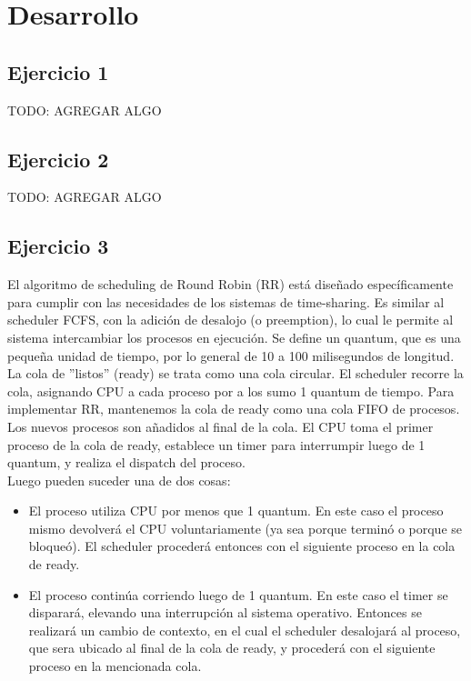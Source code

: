 \section{Desarrollo}

\subsection{Ejercicio 1}
TODO: AGREGAR ALGO

\subsection{Ejercicio 2}
TODO: AGREGAR ALGO

\subsection{Ejercicio 3}

\noindent

El algoritmo de scheduling de Round Robin\cite{silberschatz2009operating} (RR) está diseñado específicamente para cumplir con las necesidades de los sistemas de time-sharing. Es similar al scheduler FCFS, con la adición de desalojo (o preemption), lo cual le permite al sistema intercambiar los procesos en ejecución. Se define un quantum, que es una pequeña unidad de tiempo, por lo general de 10 a 100 milisegundos de longitud. La cola de ''listos'' (ready) se trata como una cola circular. El scheduler recorre la cola, asignando CPU a cada proceso por a los sumo 1 quantum de tiempo.
Para implementar RR, mantenemos la cola de ready como una cola FIFO de procesos. Los nuevos procesos son añadidos al final de la cola.  El CPU toma el primer proceso de la cola de ready, establece un timer para interrumpir luego de 1 quantum, y realiza el dispatch del proceso. \\

Luego pueden suceder una de dos cosas: 
\begin{itemize}
	\item El proceso utiliza CPU por menos que 1 quantum. En este caso el proceso mismo devolverá el CPU voluntariamente (ya sea porque terminó o porque se bloqueó). El scheduler procederá entonces con el siguiente proceso en la cola de ready. 
	\item El proceso continúa corriendo luego de 1 quantum. En este caso el timer se disparará, elevando una interrupción al sistema operativo. Entonces se realizará un cambio de contexto, en el cual el scheduler desalojará al proceso, que sera ubicado al final de la cola de ready, y procederá con el siguiente proceso en la mencionada cola.   
\end{itemize} 

